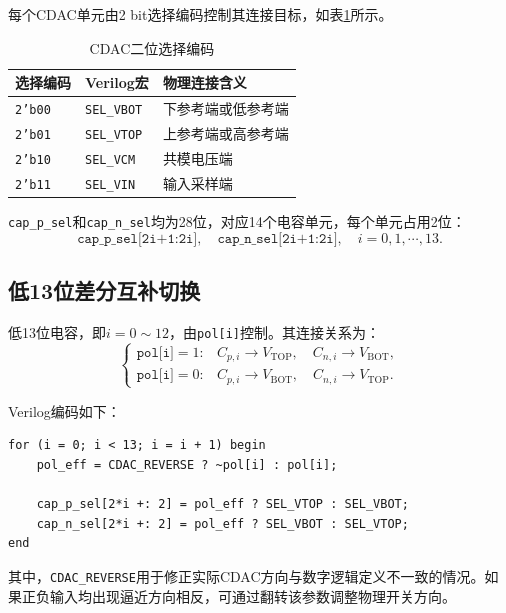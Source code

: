 每个CDAC单元由2 bit选择编码控制其连接目标，如表\ref{tab:cdac_sel_bp}所示。
\begin{table}[H]
\centering
\caption{CDAC二位选择编码}
\label{tab:cdac_sel_bp}
\begin{tabular}{lll}
\toprule
选择编码 & Verilog宏 & 物理连接含义 \\
\midrule
\texttt{2'b00} & \texttt{SEL\_VBOT} & 下参考端或低参考端 \\
\texttt{2'b01} & \texttt{SEL\_VTOP} & 上参考端或高参考端 \\
\texttt{2'b10} & \texttt{SEL\_VCM} & 共模电压端 \\
\texttt{2'b11} & \texttt{SEL\_VIN} & 输入采样端 \\
\bottomrule
\end{tabular}
\end{table}

\texttt{cap\_p\_sel}和\texttt{cap\_n\_sel}均为28位，对应14个电容单元，每个单元占用2位：
\begin{equation}
    \texttt{cap\_p\_sel[2i+1:2i]},\quad
    \texttt{cap\_n\_sel[2i+1:2i]},\quad i=0,1,\cdots,13.
\end{equation}

\subsection{低13位差分互补切换}

低13位电容，即$i=0\sim12$，由\texttt{pol[i]}控制。其连接关系为：
\begin{equation}
\begin{cases}
\texttt{pol[i]}=1: & C_{p,i}\rightarrow V_{\mathrm{TOP}},\quad C_{n,i}\rightarrow V_{\mathrm{BOT}},\\
\texttt{pol[i]}=0: & C_{p,i}\rightarrow V_{\mathrm{BOT}},\quad C_{n,i}\rightarrow V_{\mathrm{TOP}}.
\end{cases}
\end{equation}

Verilog编码如下：
\begin{lstlisting}[style=verilogstyle]
for (i = 0; i < 13; i = i + 1) begin
    pol_eff = CDAC_REVERSE ? ~pol[i] : pol[i];

    cap_p_sel[2*i +: 2] = pol_eff ? SEL_VTOP : SEL_VBOT;
    cap_n_sel[2*i +: 2] = pol_eff ? SEL_VBOT : SEL_VTOP;
end
\end{lstlisting}
其中，\texttt{CDAC\_REVERSE}用于修正实际CDAC方向与数字逻辑定义不一致的情况。如果正负输入均出现逼近方向相反，可通过翻转该参数调整物理开关方向。

